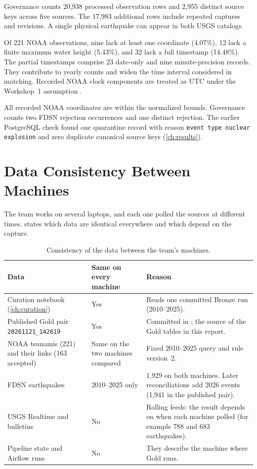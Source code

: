 \documentclass[a4paper,11pt,oneside]{book}
\newcommand{\goldstamp}{\texttt{20261121\_142619}}
\begin{document}
Governance counts 20,938 processed observation rows and 2,955 distinct source keys across five sources. The 17,983 additional rows include repeated captures and revisions. A single physical earthquake can appear in both USGS catalogs.

Of 221 NOAA observations, nine lack at least one coordinate (4.07\%), 12 lack a finite maximum water height (5.43\%), and 32 lack a full timestamp (14.48\%). The partial timestamps comprise 23 date-only and nine minute-precision records. They contribute to yearly counts and widen the time interval considered in matching. Recorded NOAA clock components are treated as UTC under the Workshop~1 assumption \cite{workshop1}.

All recorded NOAA coordinates are within the normalized bounds. Governance counts two FDSN rejection occurrences and one distinct rejection. The earlier PostgreSQL check found one quarantine record with reason \texttt{event type nuclear explosion} and zero duplicate canonical source keys (\cref{ch:results}).

\section{Data Consistency Between Machines}
\label{sec:consistency}
The team works on several laptops, and each one polled the sources at different times.  states which data are identical everywhere and which depend on the capture.

\begin{table}[htbp]
\centering
\small
\begin{tabularx}{\textwidth}{@{}L{3.6cm}L{2.4cm}Y@{}}
\toprule
Data & Same on every machine & Reason \\
\midrule
Curation notebook (\cref{ch:curation}) & Yes & Reads one committed Bronze run (2010--2025). \\
Published Gold pair \goldstamp & Yes & Committed in ; the source of the Gold tables in this report. \\
NOAA tsunamis (221) and their links (163 accepted) & Same on the two machines compared & Fixed 2010--2025 query and rule version~2. \\
FDSN earthquakes & 2010--2025 only & 1,929 on both machines. Later reconciliations add 2026 events (1,941 in the published pair). \\
USGS Realtime and bulletins & No & Rolling feeds: the result depends on when each machine polled (for example 788 and 683 earthquakes). \\
Pipeline state and Airflow runs & No & They describe the machine where Gold runs. \\
\bottomrule
\end{tabularx}
\caption{Consistency of the data between the team's machines.}
\label{tab:consistency}
\end{table}
\end{document}
